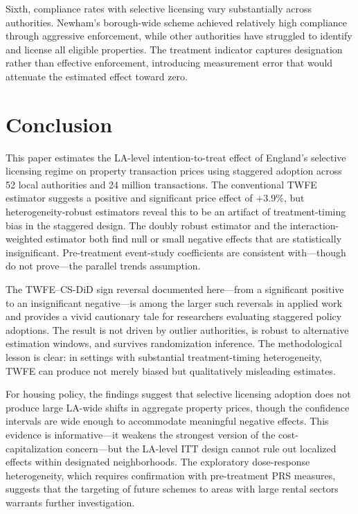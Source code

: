 \documentclass[12pt]{article}
\begin{document}
Sixth, compliance rates with selective licensing vary substantially across authorities. Newham's borough-wide scheme achieved relatively high compliance through aggressive enforcement, while other authorities have struggled to identify and license all eligible properties. The treatment indicator captures designation rather than effective enforcement, introducing measurement error that would attenuate the estimated effect toward zero.


\section{Conclusion}
\label{sec:conclusion}

This paper estimates the LA-level intention-to-treat effect of England's selective licensing regime on property transaction prices using staggered adoption across 52 local authorities and 24 million transactions. The conventional TWFE estimator suggests a positive and significant price effect of $+3.9\%$, but heterogeneity-robust estimators reveal this to be an artifact of treatment-timing bias in the staggered design. The \citet{callaway2021difference} doubly robust estimator and the \citet{sun2021estimating} interaction-weighted estimator both find null or small negative effects that are statistically insignificant. Pre-treatment event-study coefficients are consistent with---though do not prove---the parallel trends assumption.

The TWFE--CS-DiD sign reversal documented here---from a significant positive to an insignificant negative---is among the larger such reversals in applied work and provides a vivid cautionary tale for researchers evaluating staggered policy adoptions. The result is not driven by outlier authorities, is robust to alternative estimation windows, and survives randomization inference. The methodological lesson is clear: in settings with substantial treatment-timing heterogeneity, TWFE can produce not merely biased but qualitatively misleading estimates.

For housing policy, the findings suggest that selective licensing adoption does not produce large LA-wide shifts in aggregate property prices, though the confidence intervals are wide enough to accommodate meaningful negative effects. This evidence is informative---it weakens the strongest version of the cost-capitalization concern---but the LA-level ITT design cannot rule out localized effects within designated neighborhoods. The exploratory dose-response heterogeneity, which requires confirmation with pre-treatment PRS measures, suggests that the targeting of future schemes to areas with large rental sectors warrants further investigation.
\end{document}
